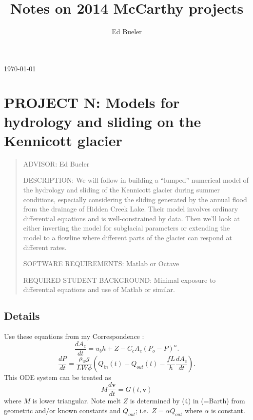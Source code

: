 \documentclass[11pt,final]{amsart}%
\title[]{Notes on 2014 McCarthy projects}
\author[]{Ed Bueler}
\newcommand\bv{\mathbf{v}}
\begin{document}

\scriptsize \hfill \today \normalsize
\vspace{0.5in}

\maketitle
\thispagestyle{empty}

\setcounter{equation}{19}

\section*{PROJECT N: Models for hydrology and sliding on the Kennicott glacier}

\begin{quote}
\noindent ADVISOR: Ed Bueler

\medskip
\noindent DESCRIPTION: We will follow \cite{Bartholomausetal2011} in building a ``lumped'' numerical model of the hydrology and sliding of the Kennicott glacier during summer conditions, especially considering the sliding generated by the annual flood from the drainage of Hidden Creek Lake.  Their model involves ordinary differential equations and is well-constrained by data.  Then we'll look at either inverting the model for subglacial parameters or extending the model to a flowline where different parts of the glacier can respond at different rates.

\medskip
\noindent SOFTWARE REQUIREMENTS: Matlab or Octave

\medskip
\noindent REQUIRED STUDENT BACKGROUND: Minimal exposure to differential equations and use of Matlab or similar.
\end{quote}

\subsection*{Details} Use these equations from my Correspondence \citep{Bueler2014correspondence}:
\begin{equation}
\frac{dA_c}{dt} = u_b h + Z - C_c A_c (P_o-P)^n.  \label{eq:barth:cavityevolution}
\end{equation}
\begin{equation}
\frac{dP}{dt} = \frac{\rho_w g}{L W \phi} \left(Q_{in}(t) - Q_{out}(t) - \frac{f L }{h} \frac{d A_c}{dt}\right).
\end{equation}
This ODE system can be treated as
\begin{equation}
M \frac{d\bv}{dt} = G(t,\bv) \label{eq:system}
\end{equation}
where $M$ is lower triangular.  Note melt $Z$ is determined by (4) in \cite{Bartholomausetal2011} (=Barth) from geometric and/or known constants and $Q_{out}$; i.e.~$Z=\alpha Q_{out}$ where $\alpha$ is constant.
\end{document}
